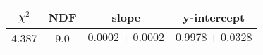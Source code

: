 \begin{tabular}{|c|c|c|c|}

\hline
$\chi^{2}$ & NDF & slope & y-intercept  \\
\hline
4.387 & 9.0 & $0.0002\pm0.0002$ & $0.9978\pm0.0328$ \\
\hline

\end{tabular}